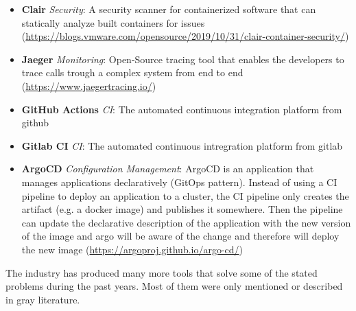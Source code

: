 \begin{itemize}
    \item \textbf{Clair} \textit{Security}:
    A security scanner for containerized software that can statically analyze
    built containers for issues
    (\url{https://blogs.vmware.com/opensource/2019/10/31/clair-container-security/})
    \item \textbf{Jaeger} \textit{Monitoring}:
    Open-Source tracing tool that enables the developers to trace calls
    trough a complex system from end to end
    (\url{https://www.jaegertracing.io/})
    \item \textbf{GitHub Actions} \textit{CI}: The automated continuous integration
    platform from github
    \item \textbf{Gitlab CI} \textit{CI}: The automated continuous intregration
    platform from gitlab
    \item \textbf{ArgoCD} \textit{Configuration Management}: ArgoCD is an
    application that manages applications declaratively (GitOps pattern).
    Instead of using a CI pipeline to deploy an application to a cluster,
    the CI pipeline only creates the artifact (e.g. a docker image) and publishes
    it somewhere. Then the pipeline can update the declarative description
    of the application with the new version of the image and argo will
    be aware of the change and therefore will deploy the new image
    (\url{https://argoproj.github.io/argo-cd/})
\end{itemize}

The industry has produced many more tools that solve some of the stated
problems during the past years. Most of them were only mentioned or described
in gray literature.
